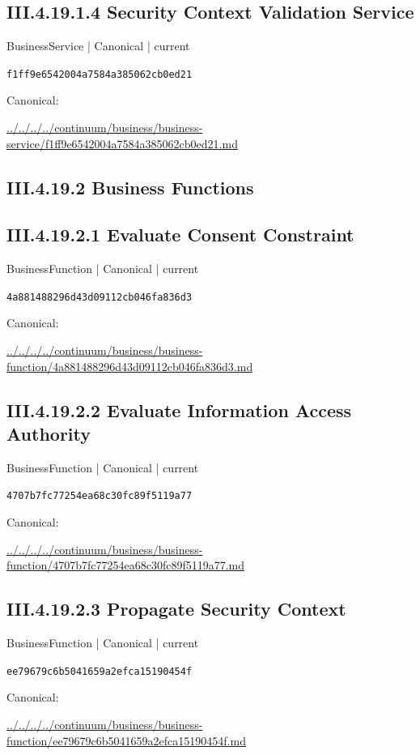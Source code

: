 \documentclass[10pt,a4paper]{article}
\begin{document}
\subsection*{III.4.19.1.4 Security Context Validation Service}
{\small BusinessService | Canonical | current}\par
\texttt{f1ff9e6542004a7584a385062cb0ed21}\par
Canonical: \par
{\footnotesize\url{../../../../continuum/business/business-service/f1ff9e6542004a7584a385062cb0ed21.md}}\par
\subsection*{III.4.19.2 Business Functions}
\subsection*{III.4.19.2.1 Evaluate Consent Constraint}
{\small BusinessFunction | Canonical | current}\par
\texttt{4a881488296d43d09112cb046fa836d3}\par
Canonical: \par
{\footnotesize\url{../../../../continuum/business/business-function/4a881488296d43d09112cb046fa836d3.md}}\par
\subsection*{III.4.19.2.2 Evaluate Information Access Authority}
{\small BusinessFunction | Canonical | current}\par
\texttt{4707b7fc77254ea68c30fc89f5119a77}\par
Canonical: \par
{\footnotesize\url{../../../../continuum/business/business-function/4707b7fc77254ea68c30fc89f5119a77.md}}\par
\subsection*{III.4.19.2.3 Propagate Security Context}
{\small BusinessFunction | Canonical | current}\par
\texttt{ee79679c6b5041659a2efca15190454f}\par
Canonical: \par
{\footnotesize\url{../../../../continuum/business/business-function/ee79679c6b5041659a2efca15190454f.md}}\par
\end{document}
